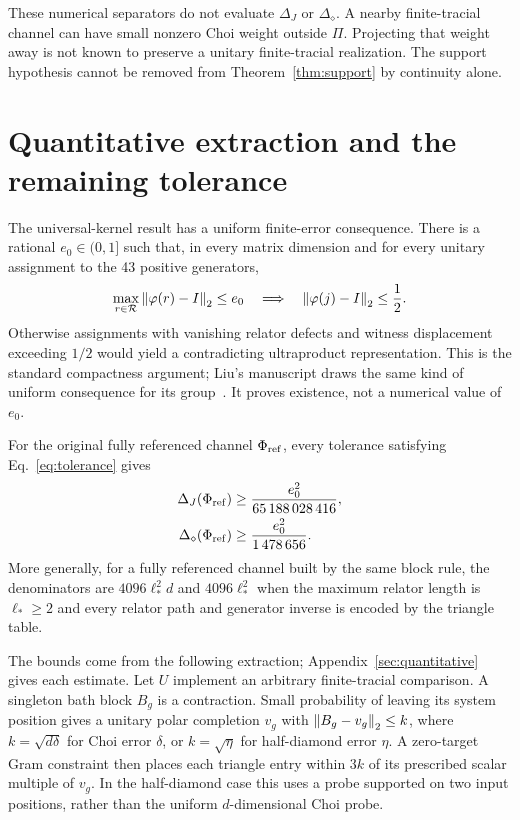 \documentclass[11pt]{article}
\begin{document}
These numerical separators do not evaluate $\Delta_J$ or $\Delta_\diamond$. A nearby
finite-tracial channel can have small nonzero Choi weight outside $\Pi$. Projecting that
weight away is not known to preserve a unitary finite-tracial realization. The support
hypothesis cannot be removed from Theorem~\ref{thm:support} by continuity alone.

\section{Quantitative extraction and the remaining tolerance}\label{sec:quant}

The universal-kernel result has a uniform finite-error consequence. There is a rational
$e_0\in(0,1]$ such that, in every matrix dimension and for every unitary assignment to the
43 positive generators,
\begin{equation}
 \max_{r\in\mathcal R}\left\lVert \varphi(r)-I\right\rVert_2\le e_0
 \quad\Longrightarrow\quad \left\lVert \varphi(j)-I\right\rVert_2\le\frac12.
 \label{eq:tolerance}
\end{equation}
Otherwise assignments with vanishing relator defects and witness displacement exceeding
$1/2$ would yield a contradicting ultraproduct representation. This is the standard
compactness argument; Liu's manuscript draws the same kind of uniform consequence for its
group~\cite[Theorem~1.1]{liu}. It proves existence, not a numerical value of $e_0$.

\begin{theorem}\label{thm:quant}
For the original fully referenced channel $\Phi_{\mathrm{ref}}$, every tolerance satisfying
Eq.~\eqref{eq:tolerance} gives
\begin{align}
 \Delta_J(\Phi_{\mathrm{ref}})&\ge\frac{e_0^2}{65\,188\,028\,416},
 \label{eq:q-choi}\\
 \Delta_\diamond(\Phi_{\mathrm{ref}})&\ge\frac{e_0^2}{1\,478\,656}.
 \label{eq:q-diamond}
\end{align}
More generally, for a fully referenced channel built by the same block rule, the
denominators are $4096\ell_*^2d$ and $4096\ell_*^2$ when the maximum relator length is
$\ell_*\ge2$ and every relator path and generator inverse is encoded by the triangle table.
\end{theorem}

The bounds come from the following extraction; Appendix~\ref{sec:quantitative} gives each estimate. Let $U$
implement an arbitrary finite-tracial comparison. A singleton bath block $B_g$ is a
contraction. Small probability of leaving its system position gives a unitary polar
completion $v_g$ with $\left\lVert B_g-v_g\right\rVert_2\le k$, where $k=\sqrt{d\delta}$ for Choi error
$\delta$, or $k=\sqrt\eta$ for half-diamond error $\eta$. A zero-target Gram constraint
then places each triangle entry within $3k$ of its prescribed scalar multiple of $v_g$.
In the half-diamond case this uses a probe supported on two input positions, rather than
the uniform $d$-dimensional Choi probe.
\end{document}
